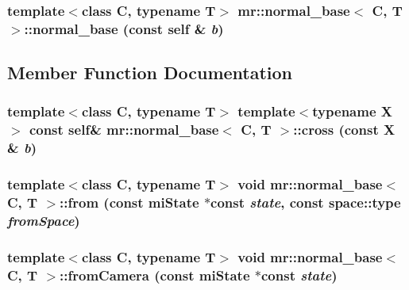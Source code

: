 \subsubsection{\setlength{\rightskip}{0pt plus 5cm}template$<$class C, typename T$>$ {\bf mr::normal\_\-base}$<$ C, T $>$::{\bf normal\_\-base} (const {\bf self} \& {\em b})\hspace{0.3cm}{\tt  [inline]}}\label{structmr_1_1normal__base_z67_0}




\subsection{Member Function Documentation}
\subsubsection{\setlength{\rightskip}{0pt plus 5cm}template$<$class C, typename T$>$ template$<$typename X$>$ const {\bf self}\& {\bf mr::normal\_\-base}$<$ C, T $>$::cross (const X \& {\em b})\hspace{0.3cm}{\tt  [inline]}}\label{structmr_1_1normal__base_z73_2}


\subsubsection{\setlength{\rightskip}{0pt plus 5cm}template$<$class C, typename T$>$ void {\bf mr::normal\_\-base}$<$ C, T $>$::from (const mi\-State $\ast$const {\em state}, const {\bf space::type} {\em from\-Space})\hspace{0.3cm}{\tt  [inline]}}\label{structmr_1_1normal__base_a13}


\subsubsection{\setlength{\rightskip}{0pt plus 5cm}template$<$class C, typename T$>$ void {\bf mr::normal\_\-base}$<$ C, T $>$::from\-Camera (const mi\-State $\ast$const {\em state})\hspace{0.3cm}{\tt  [inline]}}\label{structmr_1_1normal__base_a10}


